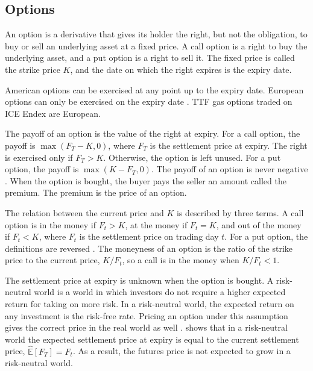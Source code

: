 \subsection{Options}\label{sec:options}
An option is a derivative that gives its holder the right, but not the obligation, to buy or sell an underlying asset at a fixed price. A call option is a right to buy the underlying asset, and a put option is a right to sell it. The fixed price is called the strike price $K$, and the date on which the right expires is the expiry date. 

American options can be exercised at any point up to the expiry date. European options can only be exercised on the expiry date \parencite[31]{hullOptionsFuturesOther2022}. TTF gas options traded on ICE Endex are European.

The payoff of an option is the value of the right at expiry. For a call option, the payoff is $\max(F_T - K, 0)$, where $F_T$ is the settlement price at expiry. The right is exercised only if $F_T > K$. Otherwise, the option is left unused.
For a put option, the payoff is $\max(K - F_T, 0)$. The payoff of an option is never negative \parencite[231]{hullOptionsFuturesOther2022}. When the option is bought, the buyer pays the seller an amount called the premium. The premium is the price of an option.

The relation between the current price and $K$ is described by three terms. A call option is in the money if $F_t > K$, at the money if $F_t = K$, and out of the money if $F_t < K$, where $F_t$ is the settlement price on trading day $t$. For a put option, the definitions are reversed \parencite[248]{hullOptionsFuturesOther2022}. The moneyness of an option is the ratio of the strike price to the current price, $K / F_t$, so a call is in the money when $K / F_t < 1$.

The settlement price at expiry is unknown when the option is bought. A risk-neutral world is a world in which investors do not require a higher expected return for taking on more risk. In a risk-neutral world, the expected return on any investment is the risk-free rate. Pricing an option under this assumption gives the correct price in the real world as well \parencite[292]{hullOptionsFuturesOther2022}.
\textcite[407]{hullOptionsFuturesOther2022} shows that in a risk-neutral world the expected settlement price at expiry is equal to the current settlement price, $\hat{\mathbb{E}}[F_T] = F_t$. As a result, the futures price is not expected to grow in a risk-neutral world.


